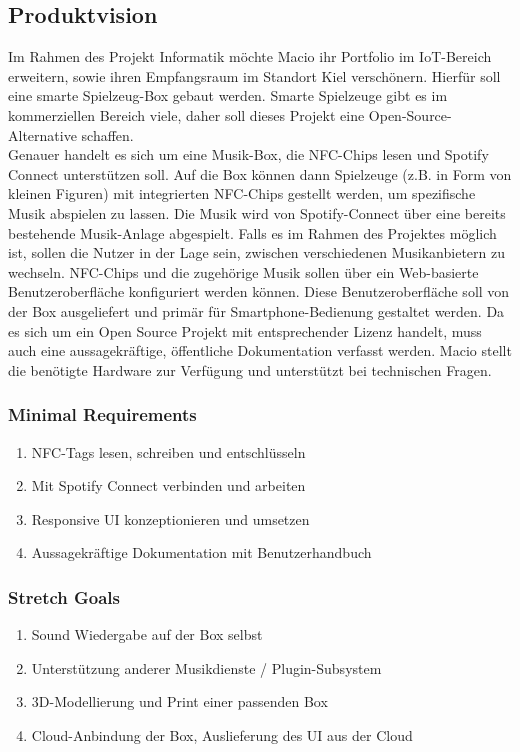 \documentclass[10pt, a4paper]{article}
\begin{document}
\subsection{Produktvision}
Im Rahmen des Projekt Informatik möchte Macio ihr Portfolio im IoT-Bereich erweitern, sowie ihren Empfangsraum im Standort Kiel verschönern.
Hierfür soll eine smarte Spielzeug-Box gebaut werden.
Smarte Spielzeuge gibt es im kommerziellen Bereich viele, daher soll dieses Projekt eine Open-Source-Alternative schaffen.\\
Genauer handelt es sich um eine Musik-Box, die NFC-Chips lesen und Spotify Connect unterstützen soll.
Auf die Box können dann Spielzeuge (z.B. in Form von kleinen Figuren) mit integrierten NFC-Chips gestellt werden, um spezifische Musik abspielen zu lassen.
Die Musik wird von Spotify-Connect über eine bereits bestehende Musik-Anlage abgespielt.
Falls es im Rahmen des Projektes möglich ist, sollen die Nutzer in der Lage sein, zwischen verschiedenen Musikanbietern zu wechseln.
NFC-Chips und die zugehörige Musik sollen über ein Web-basierte Benutzeroberfläche konfiguriert werden können.
Diese Benutzeroberfläche soll von der Box ausgeliefert und primär für Smartphone-Bedienung gestaltet werden.
Da es sich um ein Open Source Projekt mit entsprechender Lizenz handelt, muss auch eine aussagekräftige, öffentliche Dokumentation verfasst werden.
Macio stellt die benötigte Hardware zur Verfügung und unterstützt bei technischen Fragen.

\subsubsection{Minimal Requirements}
\begin{enumerate}
  \item NFC-Tags lesen, schreiben und entschlüsseln
  \item Mit Spotify Connect verbinden und arbeiten
  \item Responsive UI konzeptionieren und umsetzen
  \item Aussagekräftige Dokumentation mit Benutzerhandbuch
\end{enumerate}
\subsubsection{Stretch Goals}
\begin{enumerate}
  \item Sound Wiedergabe auf der Box selbst
  \item Unterstützung anderer Musikdienste / Plugin-Subsystem
  \item 3D-Modellierung und Print einer passenden Box
  \item Cloud-Anbindung der Box, Auslieferung des UI aus der Cloud
\end{enumerate}
\end{document}
